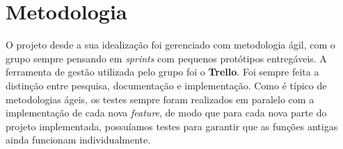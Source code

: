 \chapter{Metodologia}


O projeto desde a sua idealização foi gerenciado com metodologia ágil, com o grupo sempre pensando em \textit{sprints} com pequenos protótipos entregáveis. A ferramenta de gestão utilizada pelo grupo foi o \textbf{Trello}. Foi sempre feita a distinção entre pesquisa, documentação e implementação. Como é típico de metodologias ágeis, os testes sempre foram realizados em paralelo com a implementação de cada nova \textit{feature}, de modo que para cada nova parte do projeto implementada, possuíamos testes para garantir que as funções antigas ainda funcionam individualmente.